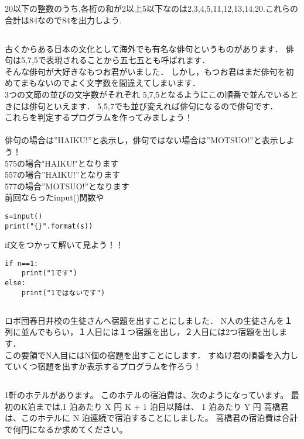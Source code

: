 \documentclass[dvipdfmx]{jsarticle}
\begin{document}
20以下の整数のうち,各桁の和が2以上5以下なのは2,3,4,5,11,12,13,14,20.これらの合計は84なので84を出力しよう.
\subsection{}
古くからある日本の文化として海外でも有名な俳句というものがあります．
俳句は5,7,5で表現されることから五七五とも呼ばれます．\\
そんな俳句が大好きなもつお君がいました．
しかし，もつお君はまだ俳句を初めてまもないのでよく文字数を間違えてしまいます．\\
3つの文節の並びの文字数がそれぞれ 5,7,5となるようにこの順番で並んでいるときには俳句といえます．
5,5,7でも並び変えれば俳句になるので俳句です．\\
これらを判定するプログラムを作ってみましょう！\\\\
俳句の場合は”HAIKU!”と表示し，俳句ではない場合は”MOTSUO!”と表示しよう！\\
575の場合"HAIKU!"となります\\
557の場合”HAIKU!”となります\\
577の場合”MOTSUO!”となります\\
前回ならったinput()関数や
\begin{lstlisting} 
s=input()
print("{}".format(s))
\end{lstlisting}
if文をつかって解いて見よう！！
\begin{lstlisting} 
if n==1:
	print("1です")
else:
	print("1ではないです")
\end{lstlisting}

\subsection{}
ロボ団春日井校の生徒さんへ宿題を出すことにしました．
N人の生徒さんを１列に並んでもらい，１人目には１つ宿題を出し，２人目には2つ宿題を出します．\\
この要領でN人目にはN個の宿題を出すことにします．
すぬけ君の順番を入力していくつ宿題を出すか表示するプログラムを作ろう！\\
\subsection{}
1軒のホテルがあります。 このホテルの宿泊費は、次のようになっています。
最初のK泊までは,1
 泊あたり 
X
 円
K
+
1
 泊目以降は、
1
 泊あたり 
Y
 円
高橋君は、このホテルに 
N
 泊連続で宿泊することにしました。 高橋君の宿泊費は合計で何円になるか求めてください。
\end{document}
